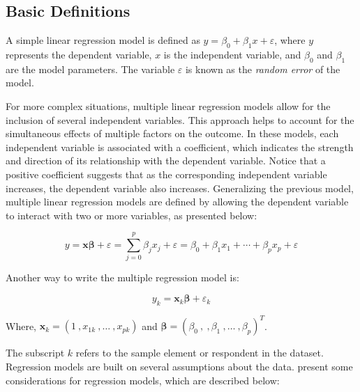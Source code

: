 \documentclass[
  12pt,
]{book}
\begin{document}
\hypertarget{basic-definitions}{%
\subsection{Basic Definitions}\label{basic-definitions}}

A simple linear regression model is defined as \(y = \beta_{0} + \beta_{1}x + \varepsilon\), where \(y\) represents the dependent variable, \(x\) is the independent variable, and \(\beta_{0}\) and \(\beta_{1}\) are the model parameters. The variable \(\varepsilon\) is known as the \emph{random error} of the model.

For more complex situations, multiple linear regression models allow for the inclusion of several independent variables. This approach helps to account for the simultaneous effects of multiple factors on the outcome. In these models, each independent variable is associated with a coefficient, which indicates the strength and direction of its relationship with the dependent variable. Notice that a positive coefficient suggests that as the corresponding independent variable increases, the dependent variable also increases. Generalizing the previous model, multiple linear regression models are defined by allowing the dependent variable to interact with two or more variables, as presented below:

\[
y  =  \boldsymbol{x} \boldsymbol{\beta} + \varepsilon
  =  \sum_{j=0}^{p} \beta_{j}x_{j} + \varepsilon
 =  \beta_{0} + \beta_{1} x_{1} + \cdots + \beta_{p} x_{p} + \varepsilon
\]

Another way to write the multiple regression model is:

\[
y_{k}  =  \boldsymbol{x}_{k} \boldsymbol{\beta} + \varepsilon_{k}
\]

Where, \(\boldsymbol{x}_{k} = \left( 1 \ , x_{1k} \ , \ldots\ , x_{pk} \right)\) and \(\boldsymbol{\beta} = \left( \beta_{0} \ , \ , \beta_{1} \ , \ldots \ , \beta_{p} \right)^{T}\).

The subscript \(k\) refers to the sample element or respondent in the dataset. Regression models are built on several assumptions about the data. \citet{Heeringa_West_Berglund_2017} present some considerations for regression models, which are described below:
\end{document}
